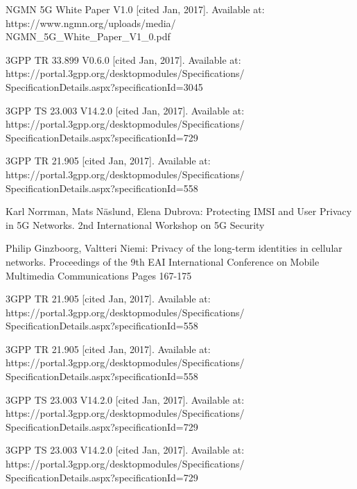 \documentclass[runningheads,a4paper]{llncs} %
\begin{document}
\begin{thebibliography}{4}

 NGMN 5G White Paper V1.0 [cited Jan, 2017]. Available at: https://www.ngmn.org/uploads/media/\\NGMN\_5G\_White\_Paper\_V1\_0.pdf

 3GPP TR 33.899 V0.6.0 [cited Jan, 2017]. Available at: https://portal.3gpp.org/desktopmodules/Specifications/\\SpecificationDetails.aspx?specificationId=3045

 3GPP TS 23.003 V14.2.0 [cited Jan, 2017]. Available at: https://portal.3gpp.org/desktopmodules/Specifications/\\SpecificationDetails.aspx?specificationId=729

 3GPP TR 21.905 [cited Jan, 2017]. Available at: https://portal.3gpp.org/desktopmodules/Specifications/\\SpecificationDetails.aspx?specificationId=558


 Karl Norrman, Mats N\"aslund, Elena Dubrova: Protecting IMSI and User Privacy in 5G Networks. 2nd International Workshop on 5G Security

 Philip Ginzboorg,  Valtteri Niemi: Privacy of the long-term identities in cellular networks. Proceedings of the 9th EAI International Conference on Mobile Multimedia Communications
Pages 167-175

 3GPP TR 21.905 [cited Jan, 2017]. Available at: https://portal.3gpp.org/desktopmodules/Specifications/\\SpecificationDetails.aspx?specificationId=558

 3GPP TR 21.905 [cited Jan, 2017]. Available at: https://portal.3gpp.org/desktopmodules/Specifications/\\SpecificationDetails.aspx?specificationId=558

 3GPP TS 23.003 V14.2.0 [cited Jan, 2017]. Available at: https://portal.3gpp.org/desktopmodules/Specifications/\\SpecificationDetails.aspx?specificationId=729

 3GPP TS 23.003 V14.2.0 [cited Jan, 2017]. Available at: https://portal.3gpp.org/desktopmodules/Specifications/\\SpecificationDetails.aspx?specificationId=729


\end{thebibliography}
\end{document}
